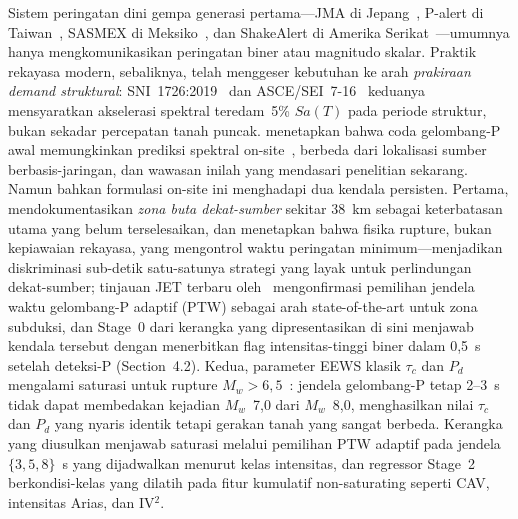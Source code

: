 \documentclass[10pt]{article}
\renewcommand{\cite}[1]{\citep{#1}}
\begin{document}
Sistem peringatan dini gempa generasi pertama---JMA di Jepang~\citet{ref7}, P-alert di Taiwan~\citet{ref8}, SASMEX di Meksiko~\citet{ref9}, dan ShakeAlert di Amerika Serikat~\citet{ref10}---umumnya hanya mengkomunikasikan peringatan biner atau magnitudo skalar. Praktik rekayasa modern, sebaliknya, telah menggeser kebutuhan ke arah \emph{prakiraan demand struktural}: SNI~1726:2019~\cite{ref12} dan ASCE/SEI~7-16~\cite{ref13} keduanya mensyaratkan akselerasi spektral teredam~5\% $Sa(T)$ pada periode struktur, bukan sekadar percepatan tanah puncak. \citet{ref16} menetapkan bahwa coda gelombang-P awal memungkinkan prediksi spektral on-site~\cite{ref17}, berbeda dari lokalisasi sumber berbasis-jaringan, dan wawasan inilah yang mendasari penelitian sekarang. Namun bahkan formulasi on-site ini menghadapi dua kendala persisten. Pertama, \citet{ref18} mendokumentasikan \emph{zona buta dekat-sumber} sekitar 38~km sebagai keterbatasan utama yang belum terselesaikan, dan \citet{ref19} menetapkan bahwa fisika rupture, bukan kepiawaian rekayasa, yang mengontrol waktu peringatan minimum---menjadikan diskriminasi sub-detik satu-satunya strategi yang layak untuk perlindungan dekat-sumber; tinjauan JET terbaru oleh~\cite{jetTatar2025} mengonfirmasi pemilihan jendela waktu gelombang-P adaptif (PTW) sebagai arah state-of-the-art untuk zona subduksi, dan Stage~0 dari kerangka yang dipresentasikan di sini menjawab kendala tersebut dengan menerbitkan flag intensitas-tinggi biner dalam 0,5~s setelah deteksi-P (Section~4.2). Kedua, parameter EEWS klasik $\tau_c$ dan $P_d$ mengalami saturasi untuk rupture $M_w > 6,5$~\cite{ref20, ref21}: jendela gelombang-P tetap 2--3~s tidak dapat membedakan kejadian $M_w$~7,0 dari $M_w$~8,0, menghasilkan nilai $\tau_c$ dan $P_d$ yang nyaris identik tetapi gerakan tanah yang sangat berbeda. Kerangka yang diusulkan menjawab saturasi melalui pemilihan PTW adaptif pada jendela $\{3, 5, 8\}$~s yang dijadwalkan menurut kelas intensitas, dan regressor Stage~2 berkondisi-kelas yang dilatih pada fitur kumulatif non-saturating seperti CAV, intensitas Arias, dan IV$^2$.
\end{document}
